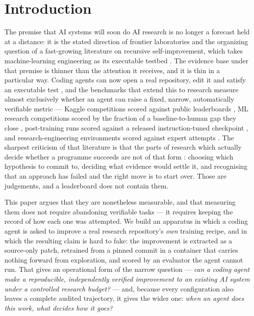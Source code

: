 \section{Introduction}
\label{sec:intro}



The premise that AI systems will soon do AI research is no longer a forecast held at a distance: it is
the stated direction of frontier laboratories and the organizing question of a fast-growing literature
on recursive self-improvement, which takes machine-learning engineering as its executable testbed
\citep{yang2026frontis,meng2026rsibench,lu2026metaagent}. The evidence base under that premise is
thinner than the attention it receives, and it is thin in a particular way. Coding agents can now open
a real repository, edit it and satisfy an executable test \citep{jimenez2024swebench}, and the
benchmarks that extend this to research measure almost exclusively whether an agent can raise a fixed,
narrow, automatically verifiable metric --- Kaggle competitions scored against public leaderboards
\citep{chan2024mlebench,qiang2025mledojo}, ML research competitions scored by the fraction of a
baseline-to-human gap they close \citep{zhang2025mlrcbench}, post-training runs scored against a
released instruction-tuned checkpoint \citep{rank2026posttrainbench}, and research-engineering
environments scored against expert attempts \citep{wijk2024rebench}. The sharpest criticism of that
literature is that the parts of research which actually decide whether a programme succeeds are not of
that form \citep{kirgis2026openended}: choosing which hypothesis to commit to,
deciding what evidence would settle it, and recognising that an approach has failed and the right move
is to start over. Those are judgements, and a leaderboard does not contain them.

This paper argues that they are nonetheless measurable, and that measuring them does not require
abandoning verifiable tasks --- it requires keeping the record of how each one was attempted. We build
an apparatus in which a coding agent is asked to improve a real research repository's \emph{own}
training recipe, and in which the resulting claim is hard to fake: the improvement is extracted as a
source-only patch, retrained from a pinned commit in a container that carries nothing forward from
exploration, and scored by an evaluator the agent cannot run. That gives an operational form of the
narrow question --- \emph{can a coding agent make a reproducible, independently verified improvement to
an existing AI system under a controlled research budget?} --- and, because every configuration also
leaves a complete audited trajectory, it gives the wider one: \emph{when an agent does this work, what
decides how it goes?}


